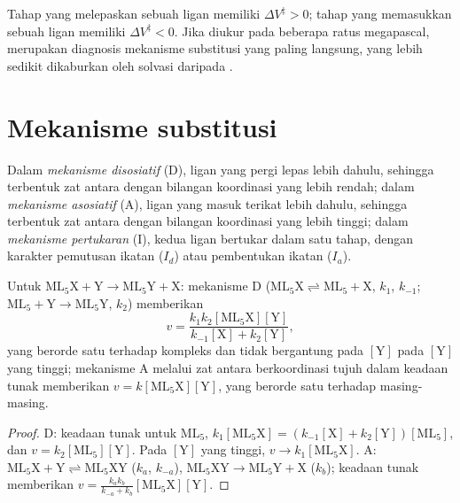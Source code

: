 Tahap yang melepaskan sebuah ligan memiliki $\Delta V^{\ddagger} > 0$; tahap yang memasukkan sebuah ligan memiliki $\Delta V^{\ddagger}
< 0$. Jika diukur pada beberapa ratus megapascal,  merupakan
diagnosis mekanisme substitusi yang paling langsung, yang lebih sedikit
dikaburkan oleh solvasi daripada .

\section{Mekanisme substitusi}

\begin{definition}\label{def:b3:complex-mechanisms:mechanisms}
Dalam \emph{mekanisme disosiatif} (D), ligan yang
pergi lepas lebih dahulu, sehingga terbentuk zat antara dengan bilangan
koordinasi yang lebih rendah; dalam \emph{mekanisme asosiatif} (A), ligan
yang masuk terikat lebih dahulu, sehingga terbentuk zat antara dengan bilangan
koordinasi yang lebih tinggi; dalam \emph{mekanisme pertukaran} (I),
kedua ligan bertukar dalam satu tahap, dengan karakter pemutusan ikatan ($I_d$)
atau pembentukan ikatan ($I_a$).
\end{definition}

\begin{proposition}\label{prop:b3:complex-mechanisms:d-a-laws}
Untuk $\mathrm{ML_5X + Y \to ML_5Y + X}$: mekanisme D ($\mathrm{ML_5X} \rightleftharpoons \mathrm{ML_5} + \mathrm X$, $k_1$, $k_{-1}$; $\mathrm{ML_5} + \mathrm Y
\to \mathrm{ML_5Y}$, $k_2$) memberikan
\[
  v = \frac{k_1k_2[\mathrm{ML_5X}][\mathrm Y]}{k_{-1}[\mathrm X] + k_2[\mathrm Y]},
\]
yang berorde satu terhadap kompleks dan tidak bergantung pada $[\mathrm Y]$ pada $[\mathrm Y]$ yang tinggi; mekanisme A
melalui zat antara berkoordinasi tujuh dalam keadaan tunak memberikan $v =
k[\mathrm{ML_5X}][\mathrm Y]$, yang berorde satu terhadap masing-masing.
\end{proposition}

\begin{proof}
D: keadaan tunak untuk $\mathrm{ML_5}$, $k_1[\mathrm{ML_5X}] = (k_{-1}[\mathrm X] + k_2[\mathrm Y])[\mathrm{ML_5}]$, dan $v = k_2[\mathrm{ML_5}][\mathrm Y]$.
Pada $[\mathrm Y]$ yang tinggi, $v \to k_1[\mathrm{ML_5X}]$. A: $\mathrm{ML_5X} + \mathrm Y \rightleftharpoons \mathrm{ML_5XY}$ ($k_a$, $k_{-a}$), $\mathrm{ML_5XY} \to
\mathrm{ML_5Y} + \mathrm X$ ($k_b$); keadaan tunak memberikan $v = \frac{k_ak_b}{k_{-a} + k_b}[\mathrm{ML_5X}][\mathrm Y]$.
\end{proof}

